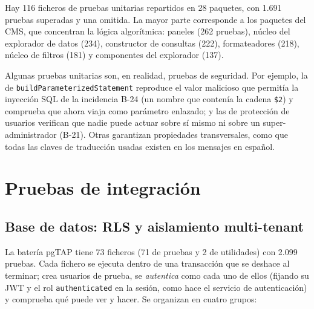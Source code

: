 Hay 116 ficheros de pruebas unitarias repartidos en 28 paquetes, con 1.691
pruebas superadas y una omitida. La mayor parte corresponde a los paquetes
del CMS, que concentran la lógica algorítmica: paneles (262 pruebas), núcleo
del explorador de datos (234), constructor de consultas (222), formateadores
(218), núcleo de filtros (181) y componentes del explorador (137).

Algunas pruebas unitarias son, en realidad, pruebas de seguridad. Por
ejemplo, la de \texttt{buildParameterizedStatement} reproduce el valor
malicioso que permitía la inyección SQL de la incidencia B-24
(un nombre que contenía la cadena \texttt{\$2}) y comprueba que ahora viaja
como parámetro enlazado; y las de protección de usuarios verifican que nadie
puede actuar sobre sí mismo ni sobre un super-administrador (B-21). Otras
garantizan propiedades transversales, como que todas las claves de traducción
usadas existen en los mensajes en español.

\section{Pruebas de integración}
\label{sec:pru-integracion}

\subsection{Base de datos: RLS y aislamiento multi-tenant}
\label{sec:pru-pgtap}

La batería pgTAP tiene 73 ficheros (71 de pruebas y 2 de utilidades) con
2.099 pruebas. Cada fichero se ejecuta dentro de una transacción que se
deshace al terminar; crea usuarios de prueba, se \emph{autentica} como cada
uno de ellos (fijando su JWT y el rol \texttt{authenticated} en la sesión,
como hace el servicio de autenticación) y comprueba qué puede ver y hacer.
Se organizan en cuatro grupos:

